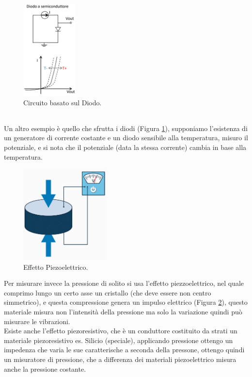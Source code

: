 \documentclass[11pt, twocolumn]{article}
\begin{document}
\begin{figure}[!h]
  \centering
  \includegraphics[width=\linewidth,height=5cm]{imgs/diodo.png}
  \caption{Circuito basato sul Diodo.}
  \label{fig:diodo}
\end{figure}\\
Un altro esempio è quello che sfrutta i diodi (Figura \ref{fig:diodo}), supponiamo l'esistenza di un generatore di corrente costante e un diodo sensibile alla temperatura, misuro il potenziale, e si nota che il potenziale (data la stessa corrente) cambia in base alla temperatura.
\begin{figure}[!h]
  \centering
  \includegraphics[width=\linewidth,height=5cm]{imgs/piezoelettrico.png}
  \caption{Effetto Piezoelettrico.}
  \label{fig:piezoelettrico}
\end{figure}
Per misurare invece la pressione di solito si usa l'effetto piezzoelettrico, nel quale comprimo lungo un certo asse un cristallo (che deve essere non centro simmetrico), e questa compressione genera un impulso elettrico (Figura \ref{fig:piezoelettrico}), questo materiale misura non l'intensità della pressione ma solo la variazione quindi può misurare le vibrazioni.\\
Esiste anche l'effetto piezoresistivo, che è un conduttore costituito da strati un materiale piezoresistivo es. Silicio (speciale), applicando pressione ottengo un impedenza che varia le sue caratterische a seconda della pressone, ottengo quindi un misuratore di pressione, che a differenza dei materiali piezoelettrico misura anche la pressione costante.
\end{document}

